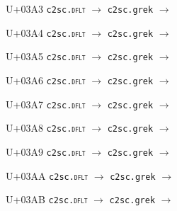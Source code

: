\documentclass{article}
\begin{document}
\begin{substitutions}
\goodbreak

U+03A3  \linebreak
    \texttt{c2sc.\textsc{dflt}} $\to$  \linebreak
    \texttt{c2sc.grek} $\to$  

\goodbreak

U+03A4  \linebreak
    \texttt{c2sc.\textsc{dflt}} $\to$  \linebreak
    \texttt{c2sc.grek} $\to$  

\goodbreak

U+03A5  \linebreak
    \texttt{c2sc.\textsc{dflt}} $\to$  \linebreak
    \texttt{c2sc.grek} $\to$  

\goodbreak

U+03A6  \linebreak
    \texttt{c2sc.\textsc{dflt}} $\to$  \linebreak
    \texttt{c2sc.grek} $\to$  

\goodbreak

U+03A7  \linebreak
    \texttt{c2sc.\textsc{dflt}} $\to$  \linebreak
    \texttt{c2sc.grek} $\to$  

\goodbreak

U+03A8  \linebreak
    \texttt{c2sc.\textsc{dflt}} $\to$  \linebreak
    \texttt{c2sc.grek} $\to$  

\goodbreak

U+03A9  \linebreak
    \texttt{c2sc.\textsc{dflt}} $\to$  \linebreak
    \texttt{c2sc.grek} $\to$  

\goodbreak

U+03AA  \linebreak
    \texttt{c2sc.\textsc{dflt}} $\to$  \linebreak
    \texttt{c2sc.grek} $\to$  

\goodbreak

U+03AB  \linebreak
    \texttt{c2sc.\textsc{dflt}} $\to$  \linebreak
    \texttt{c2sc.grek} $\to$  


\end{substitutions}
\end{document}
